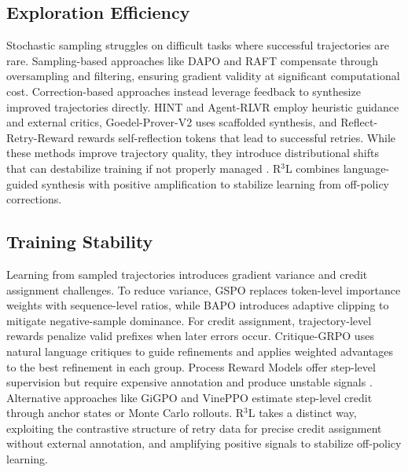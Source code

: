 \documentclass[11pt]{article}
\theoremstyle{definition}
\theoremstyle{remark}
\begin{document}
\subsection{Exploration Efficiency}
Stochastic sampling struggles on difficult tasks where successful trajectories are rare. Sampling-based approaches like DAPO \cite{yu2025dapo} and RAFT \cite{dongraft} compensate through oversampling and filtering, ensuring gradient validity at significant computational cost. Correction-based approaches instead leverage feedback to synthesize improved trajectories directly. HINT \cite{wang2025hint} and Agent-RLVR \cite{da2025agent} employ heuristic guidance and external critics, Goedel-Prover-V2 \cite{lin2025goedel} uses scaffolded synthesis, and Reflect-Retry-Reward \cite{bensal2025reflect} rewards self-reflection tokens that lead to successful retries. While these methods improve trajectory quality, they introduce distributional shifts that can destabilize training if not properly managed \cite{zheng2025prosperity}. R$^3$L combines language-guided synthesis with positive amplification to stabilize learning from off-policy corrections. 

\subsection{Training Stability}
Learning from sampled trajectories introduces gradient variance and credit assignment challenges. To reduce variance, GSPO \cite{zheng2025group} replaces token-level importance weights with sequence-level ratios, while BAPO \cite{xi2025bapo} introduces adaptive clipping to mitigate negative-sample dominance. For credit assignment, trajectory-level rewards penalize valid prefixes when later errors occur. Critique-GRPO \cite{zhang2025critique} uses natural language critiques to guide refinements and applies weighted advantages to the best refinement in each group. Process Reward Models \cite{wang2024math} offer step-level supervision but require expensive annotation and produce unstable signals \cite{xiong2024watch}. Alternative approaches like GiGPO \cite{feng2025group} and VinePPO \cite{kazemnejad2024vineppo} estimate step-level credit through anchor states or Monte Carlo rollouts. R$^3$L takes a distinct way, exploiting the contrastive structure of retry data for precise credit assignment without external annotation, and amplifying positive signals to stabilize off-policy learning.
\end{document}
